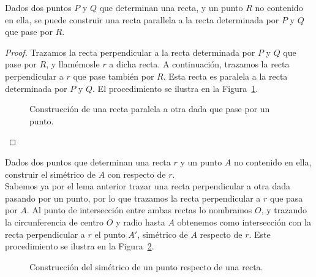 \begin{lema}
    Dados dos puntos $P$ y $Q$ que determinan una recta, y un punto $R$ no contenido en ella, se puede construir una recta parallela a la recta determinada por $P$ y $Q$ que pase por $R$.
    \begin{proof}
        Trazamos la recta perpendicular a la recta determinada por $P$ y $Q$ que pase por $R$, y llamémosle $r$ a dicha recta. A continuación, trazamos la recta perpendicular a $r$ que pase también por $R$. Esta recta es paralela a la recta determinada por $P$ y $Q$. El procedimiento se ilustra en la Figura~\ref{fig:paralela}.
        \begin{figure}[h]
            \centering
            \caption{Construcción de una recta paralela a otra dada que pase por un punto.}
            \label{fig:paralela}
        \end{figure}
    \end{proof}
\end{lema}

\begin{ejercicio}\label{ej:simetrico}
    Dados dos puntos que determinan una recta $r$ y un punto $A$ no contenido en ella, construir el simétrico de $A$ con respecto de $r$.\\

    \noindent
    Sabemos ya por el lema anterior trazar una recta perpendicular a otra dada pasando por un punto, por lo que trazamos la recta perpendicular a $r$ que pasa por $A$. Al punto de intersección entre ambas rectas lo nombramos $O$, y trazando la circunferencia de centro $O$ y radio hasta $A$ obtenemos como intersección con la recta perpendicular a $r$ el punto $A'$, simétrico de $A$ respecto de $r$. Este procedimiento se ilustra en la Figura~\ref{fig:simetrico}.
    \begin{figure}[h]
        \centering
        \caption{Construcción del simétrico de un punto respecto de una recta.}
        \label{fig:simetrico}
    \end{figure}
\end{ejercicio}

